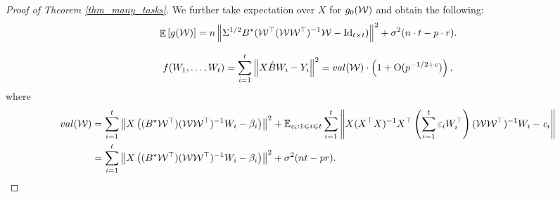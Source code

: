 \begin{proof}[Proof of Theorem \ref{thm_many_tasks}]
	We further take expectation over $X$ for $g_0({\mathcal W})$ and obtain the following:
	\begin{align*}
		\mathop{\mathbb{E}}\left[ g({\mathcal W}) \right] = n \left\| \Sigma^{1/2} B^{\star} ({\mathcal W}^{\top} ({\mathcal W} {\mathcal W}^{\top})^{-1} {\mathcal W} - \operatorname{Id}_{t\times t}) \right\|^2 + \sigma^2 (n\cdot t - p \cdot r).
	\end{align*}
\iffalse
{\color{red}
\begin{align*}
	f(W_1, \dots, W_t) = \sum_{i=1}^t \left\| X \hat B W_i - Y_i \right\|^2 = val(\mathcal W) \cdot \left( 1+\operatorname{O}(p^{-1/2+{\mathit{c}}})\right),
\end{align*}
where
\begin{align*}
	 val(\mathcal W) &= \sum_{i=1}^t  \left\| X\left({(B^\star \mathcal W^\top) (\mathcal W\mathcal W^{\top})^{-1} W_i - \beta_i}\right) \right\|^2 + \mathbb{E}_{{\mathit{c}}_i:1\leqslant i \leqslant t}\sum_{i=1}^t\left\| X(X^{\top}X)^{-1}X^{\top} \left({\sum_{i=1}^t \varepsilon_i W_i^{\top}}\right) (\mathcal W \mathcal W^{\top})^{-1}W_i -{\mathit{c}}_i\right\| \\
	 &= \sum_{i=1}^t  \left\| X\left({(B^\star \mathcal W^\top) (\mathcal W\mathcal W^{\top})^{-1} W_i - \beta_i}\right) \right\|^2 + \sigma^2 (nt-pr).
\end{align*}

}
\end{proof}
